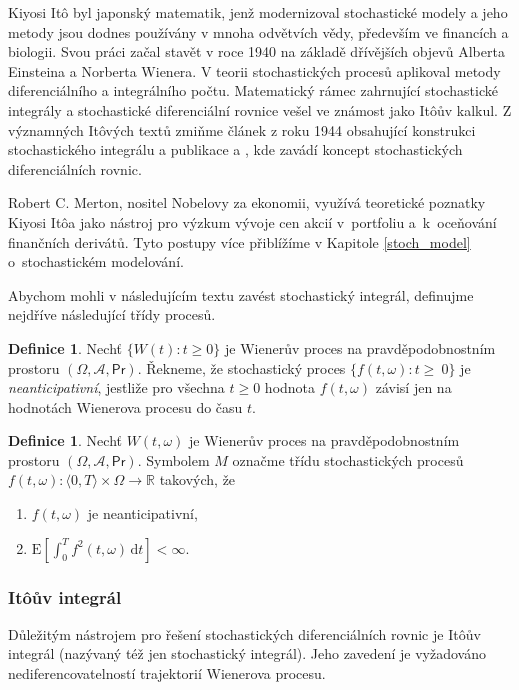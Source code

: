 \documentclass[a4paper,12pt]{report}
\theoremstyle{definition} \newtheorem{definice}[veta]{Definice}
\theoremstyle{remark}
\begin{document}
Kiyosi It\^o byl japonský matematik, jenž modernizoval stochastické modely a jeho metody jsou dodnes používány v mnoha odvětvích vědy, především ve financích a biologii.
Svou práci začal stavět v roce 1940 na základě dřívějších objevů Alberta Einsteina a Norberta Wienera.
V teorii stochastických procesů aplikoval metody diferenciálního a integrálního počtu.
Matematický rámec zahrnující stochastické integrály a stochastické diferenciální rovnice vešel ve známost jako It\^oův kalkul.
Z významných It\^ových textů zmiňme 
článek \cite{ito1944} z roku 1944 obsahující konstrukci stochastického integrálu
a publikace \cite{ito1946} a
\cite{ito1951stochastic}, kde zavádí koncept stochastických diferenciálních rovnic.

Robert C. Merton, nositel Nobelovy za ekonomii, využívá teoretické poznatky Kiyosi It\^oa jako nástroj pro výzkum vývoje cen akcií v~portfoliu a~k~oceňování finančních derivátů.
Tyto postupy více přiblížíme v Kapitole \ref{stoch_model} o~stochastickém modelování.

Abychom mohli v následujícím textu zavést stochastický integrál, definujme nejdříve následující třídy procesů.
\begin{definice}
Nechť $\{W(t):t\ge0\}$ je Wienerův proces na pravděpodobnostním prostoru $(\Omega,\mathcal{A},\mathsf{Pr})$.
Řekneme, že stochastický proces $\{f(t,\omega):t\ge~0\}$ je \textit{neanticipativní}, jestliže pro všechna $t\ge0$ hodnota $f(t,\omega)$ závisí jen na hodnotách Wienerova procesu do času $t$.
\end{definice}

\begin{definice}\label{M}
Nechť $W(t,\omega)$ je Wienerův proces na pravděpodobnostním prostoru $(\Omega,\mathcal{A},\mathsf{Pr})$.
Symbolem $M$ označme třídu stochastických procesů \linebreak$f(t,\omega):\langle0,T\rangle\times\Omega\to\mathbb R$ takových, že
\begin{enumerate}
\item $f(t,\omega)$ je neanticipativní, 
\item $\text{E}\left[\int_0^Tf^2(t,\omega)\,\mathrm{d}t\right]<\infty.$ 
\end{enumerate}
\end{definice}

\subsubsection{It\^oův integrál}\label{Ito_integral}
Důležitým nástrojem pro řešení stochastických diferenciálních rovnic je It\^oův integrál (nazývaný též jen stochastický integrál).
Jeho zavedení je vyžadováno nediferencovatelností trajektorií Wienerova procesu.
\end{document}
